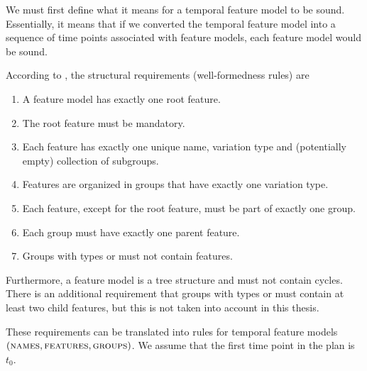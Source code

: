 We must first define what it means for a temporal feature model to be sound. Essentially, it means that if we converted the temporal feature model into a sequence of time points associated with feature models, each feature model would be sound.

According to \cite{art:consistency-preserving-evolution-planning}, the structural requirements (well-formedness rules) are 
\begin{enumerate}[\itbf{WF\arabic*}, itemsep=0mm]
   \item A feature model has exactly one root feature.
   \item The root feature must be mandatory.
   \item Each feature has exactly one unique name, variation type and (potentially empty) collection of subgroups.
   \item Features are organized in groups that have exactly one variation type.
   \item Each feature, except for the root feature, must be part of exactly one group.
   \item Each group must have exactly one parent feature.
   \item Groups with types \xortype{} or \ortype{} must not contain \mandatory{} features.
\end{enumerate}

Furthermore, a feature model is a tree structure and must not contain cycles. There is an additional requirement that groups with types \xortype{} or \ortype{} must contain at least two child features, but this is not taken into account in this thesis.

These requirements can be translated into rules for temporal feature models $(\textsc{names}, \textsc{features}, \textsc{groups}{})$. We assume that the first time point in the plan is $t_0$.

